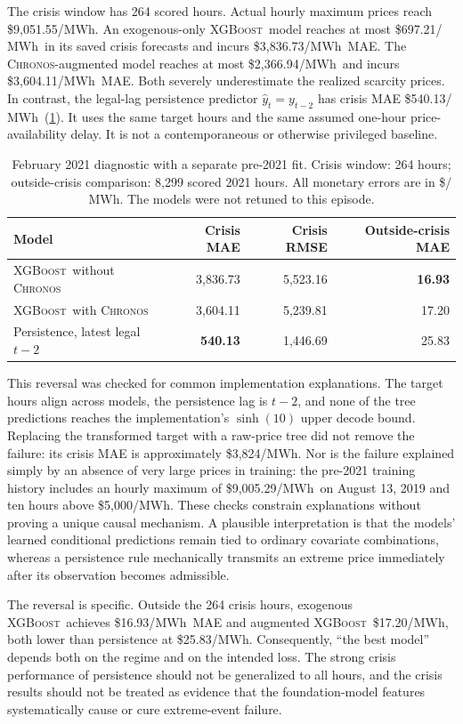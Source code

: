 \documentclass[11pt,letterpaper]{article}
\newcommand{\MWh}{\ensuremath{\mathrm{MWh}}}
\newcommand{\Chronos}{\textsc{Chronos}}
\newcommand{\XGB}{\textsc{XGBoost}}
\begin{document}
The crisis window has 264 scored hours. Actual hourly maximum prices reach \$9,051.55/\MWh. An exogenous-only \XGB\ model reaches at most \$697.21/\MWh\ in its saved crisis forecasts and incurs \$3,836.73/\MWh\ MAE. The \Chronos-augmented model reaches at most \$2,366.94/\MWh\ and incurs \$3,604.11/\MWh\ MAE. Both severely underestimate the realized scarcity prices. In contrast, the legal-lag persistence predictor $\hat y_t=y_{t-2}$ has crisis MAE \$540.13/\MWh\ (\cref{tab:crisis}). It uses the same target hours and the same assumed one-hour price-availability delay. It is not a contemporaneous or otherwise privileged baseline.

\begin{table}[t]
\centering\small
\caption{February 2021 diagnostic with a separate pre-2021 fit. Crisis window: 264 hours; outside-crisis comparison: 8,299 scored 2021 hours. All monetary errors are in \$/\MWh. The models were not retuned to this episode.}\label{tab:crisis}
\begin{tabular}{@{}lrrr@{}}
\toprule
Model & Crisis MAE & Crisis RMSE & Outside-crisis MAE\\
\midrule
\XGB\ without \Chronos & 3,836.73 & 5,523.16 & \textbf{16.93}\\
\XGB\ with \Chronos & 3,604.11 & 5,239.81 & 17.20\\
Persistence, latest legal $t-2$ & \textbf{540.13} & 1,446.69 & 25.83\\
\bottomrule
\end{tabular}
\end{table}

This reversal was checked for common implementation explanations. The target hours align across models, the persistence lag is $t-2$, and none of the tree predictions reaches the implementation's $\sinh(10)$ upper decode bound. Replacing the transformed target with a raw-price tree did not remove the failure: its crisis MAE is approximately \$3,824/\MWh. Nor is the failure explained simply by an absence of very large prices in training: the pre-2021 training history includes an hourly maximum of \$9,005.29/\MWh\ on August 13, 2019 and ten hours above \$5,000/\MWh. These checks constrain explanations without proving a unique causal mechanism. A plausible interpretation is that the models' learned conditional predictions remain tied to ordinary covariate combinations, whereas a persistence rule mechanically transmits an extreme price immediately after its observation becomes admissible.

The reversal is specific. Outside the 264 crisis hours, exogenous \XGB\ achieves \$16.93/\MWh\ MAE and augmented \XGB\ \$17.20/\MWh, both lower than persistence at \$25.83/\MWh. Consequently, ``the best model'' depends both on the regime and on the intended loss. The strong crisis performance of persistence should not be generalized to all hours, and the crisis results should not be treated as evidence that the foundation-model features systematically cause or cure extreme-event failure.
\end{document}
